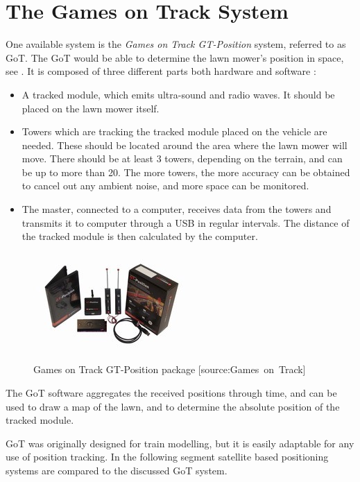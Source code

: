 \section{The Games on Track System}
One available system is the \emph{Games on Track GT-Position} system, referred to as GoT. The GoT would be able to determine the lawn mower's position in space, see . It is composed of three different parts both hardware and software \cite{GoTWebsitePos}:

\begin{itemize}
	\item A tracked module, which emits ultra-sound and radio waves. It should be placed on the lawn mower itself.
	\item Towers which are tracking the tracked module placed on the vehicle are needed. These should be located around the area where the lawn mower will move. There should be at least 3 towers, depending on the terrain, and can be up to more than 20. The more towers, the more accuracy can be obtained to cancel out any ambient noise, and more space can be monitored.
	\item The master, connected to a computer, receives data from the towers and transmits it to computer through a USB in regular intervals. The distance of the tracked module is then calculated by the computer.
\end{itemize}

\begin{figure}[H]
\centering
\includegraphics[scale=1.1]{figures/gotSystem.jpg} 
\caption{Games on Track GT-Position package [source:Games\ on\ Track]} 
\label{fig:GoTsystem}
\end{figure}\vspace{-5mm}
\noindent
%
The GoT software aggregates the received positions through time, and can be used to draw a map of the lawn, and to determine the absolute position of the tracked module.

GoT was originally designed for train modelling, but it is easily adaptable for any use of position tracking. In the following segment satellite based positioning systems are compared to the discussed GoT system.